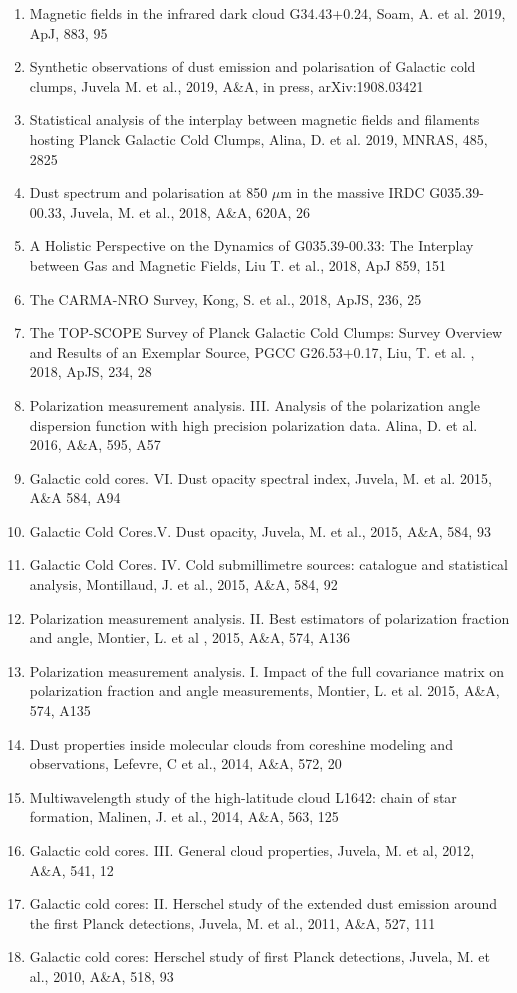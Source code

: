 \documentclass[11pt]{amsart}
\begin{document}
\begin{enumerate}
\item Magnetic fields in the infrared dark cloud G34.43+0.24,
Soam, A. et al. 2019, ApJ, 883, 95
\item Synthetic observations of dust emission and polarisation of Galactic cold clumps, 
Juvela M. et al.,  2019, A\&A, in press, arXiv:1908.03421
\item Statistical analysis of the interplay between magnetic fields and filaments hosting Planck Galactic Cold Clumps, 
Alina, D. et al.  2019,  MNRAS, 485, 2825
\item Dust spectrum and polarisation at 850 $\mu$m in the massive IRDC G035.39-00.33,
Juvela, M. et al.,  2018, A\&A,  620A, 26
\item A Holistic Perspective on the Dynamics of G035.39-00.33: 
The Interplay between Gas and Magnetic 
Fields,
Liu T. et al., 2018, ApJ 859, 151 
\item The CARMA-NRO Survey,
Kong, S. et al., 2018, ApJS, 236, 25
\item The TOP-SCOPE Survey of Planck Galactic Cold Clumps: Survey Overview and Results of an Exemplar Source, PGCC G26.53+0.17,
Liu, T.  et al. , 2018, ApJS, 234, 28
\item Polarization measurement analysis. III. Analysis of the polarization angle dispersion function with high precision polarization data.
Alina, D. et al. 2016, A\&A, 595, A57 
\item Galactic cold cores. VI. Dust opacity spectral index,
Juvela, M.  et al.  2015, A\&A 584, A94
\item Galactic Cold Cores.V. Dust opacity, 
Juvela, M. et al., 2015, A\&A, 584, 93 
\item Galactic Cold Cores. IV. Cold submillimetre sources: catalogue and statistical analysis, 
Montillaud, J. et al., 2015, A\&A, 584, 92 
\item Polarization measurement analysis. II. Best estimators of polarization fraction and angle,
Montier, L. et al , 2015, A\&A, 574, A136 
\item Polarization measurement analysis. I. Impact of the full covariance matrix on polarization fraction and angle measurements, 
Montier, L. et al. 2015,  A\&A, 574, A135 
\item Dust properties inside molecular clouds from coreshine modeling and observations, 
Lefevre, C et al., 2014, A\&A, 572, 20 
\item Multiwavelength study of the high-latitude cloud L1642: chain of star formation, 
Malinen, J. et al., 2014, A\&A, 563, 125 
\item Galactic cold cores. III. General cloud properties,
Juvela, M. et al, 2012, A\&A, 541, 12 
\item Galactic cold cores: II. Herschel study of the extended dust emission around the first Planck detections, 
Juvela, M. et al., 2011, A\&A, 527, 111 
\item Galactic cold cores: Herschel study of first Planck detections, 
Juvela, M. et al., 2010, A\&A, 518, 93  
\end{enumerate}
\end{document}
